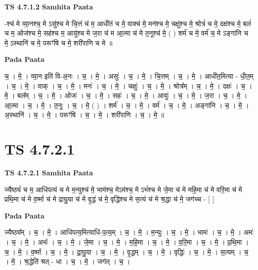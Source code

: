 \documentclass[17pt]{extarticle}
\begin{document}
\textbf{TS 4.7.1.2 } \newline
\textbf{Samhita Paata} \newline

-श्च॑ मे व्या॒नश्च॒ मे ऽसु॑श्च मे चि॒त्तं च॑ म॒ आधी॑तं च मे॒ वाक्च॑ मे॒ मन॑श्च मे॒ चक्षु॑श्च मे॒ श्रोत्रं॑ च मे॒ दक्ष॑श्च मे॒ बलं॑ च म॒ ओज॑श्च मे॒ सह॑श्च म॒ आयु॑श्च मे ज॒रा च॑ म आ॒त्मा च॑ मे त॒नूश्च॑ मे॒ ( ) शर्म॑ च मे॒ वर्म॑ च॒ मे ऽङ्गा॑नि च मे॒ ऽस्थानि॑ च मे॒ परूꣳ॑षि च मे॒ शरी॑राणि च मे ॥ \newline

\textbf{Pada Paata} \newline

च॒ । मे॒ । व्या॒न इति॑ वि-अ॒नः । च॒ । मे॒ । असुः॑ । च॒ । मे॒ । चि॒त्तम् । च॒ । मे॒ । आधी॑त॒मित्या - धी॒त॒म् । च॒ । मे॒ । वाक् । च॒ । मे॒ । मनः॑ । च॒ । मे॒ । चक्षुः॑ । च॒ । मे॒ । श्रोत्र᳚म् । च॒ । मे॒ । दक्षः॑ । च॒ । मे॒ । बल᳚म् । च॒ । मे॒ । ओजः॑ । च॒ । मे॒ । सहः॑ । च॒ । मे॒ । आयुः॑ । च॒ । मे॒ । ज॒रा । च॒ । मे॒ । आ॒त्मा । च॒ । मे॒ । त॒नूः । च॒ । मे॒ ( ) । शर्म॑ । च॒ । मे॒ । वर्म॑ । च॒ । मे॒ । अङ्गा॑नि । च॒ । मे॒ । अ॒स्थानि॑ । च॒ । मे॒ । परूꣳ॑षि । च॒ । मे॒ । शरी॑राणि । च॒ । मे॒ ॥  \newline




\section*{ TS 4.7.2.1 }

\textbf{TS 4.7.2.1 } \newline
\textbf{Samhita Paata} \newline

ज्यैष्ठ्यं॑ च म॒ आधि॑पत्यं च मे म॒न्युश्च॑ मे॒ भाम॑श्च॒ मेऽम॑श्च॒ मे ऽभं॑श्च मे जे॒मा च॑ मे महि॒मा च॑ मे वरि॒मा च॑ मे      प्रथि॒मा च॑ मे व॒र्ष्मा च॑ मे द्राघु॒या च॑ मे वृ॒द्धं च॑ मे॒      वृद्धि॑श्च मे स॒त्यं च॑ मे श्र॒द्धा च॑ मे॒ जग॑च्च - [  ] \newline

\textbf{Pada Paata} \newline

ज्यैष्ठ्य᳚म् । च॒ । मे॒ । आधि॑पत्य॒मित्याधि॑-प॒त्य॒म् । च॒ । मे॒ । म॒न्युः । च॒ । मे॒ । भामः॑ । च॒ । मे॒ । अमः॑ । च॒ । मे॒ । अभंः॑ । च॒ । मे॒ । जे॒मा । च॒ । मे॒ । म॒हि॒मा । च॒ । मे॒ । व॒रि॒मा । च॒ । मे॒ । प्र॒थि॒मा । च॒ । मे॒ । व॒र्ष्मा । च॒ । मे॒ । द्रा॒घु॒या । च॒ । मे॒ । वृ॒द्धम् । च॒ । मे॒ । वृद्धिः॑ । च॒ । मे॒ । स॒त्यम् । च॒ । मे॒ । श्र॒द्धेति॑ श्रत् - धा । च॒ । मे॒ । जग॑त् । च॒ ।  \newline
\end{document}

